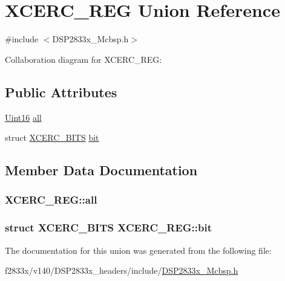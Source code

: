 \hypertarget{union_x_c_e_r_c___r_e_g}{}\section{X\+C\+E\+R\+C\+\_\+\+R\+E\+G Union Reference}
\label{union_x_c_e_r_c___r_e_g}


{\ttfamily \#include $<$D\+S\+P2833x\+\_\+\+Mcbsp.\+h$>$}



Collaboration diagram for X\+C\+E\+R\+C\+\_\+\+R\+E\+G\+:
\subsection*{Public Attributes}
\begin{DoxyCompactItemize}
\item 
\hyperlink{_d_s_p2833x___device_8h_a59a9f6be4562c327cbfb4f7e8e18f08b}{Uint16} \hyperlink{union_x_c_e_r_c___r_e_g_ada998b2975a3be053f4df00200d0ba6f}{all}
\item 
struct \hyperlink{struct_x_c_e_r_c___b_i_t_s}{X\+C\+E\+R\+C\+\_\+\+B\+I\+T\+S} \hyperlink{union_x_c_e_r_c___r_e_g_a4f09084acb6eabceec9b60781bb131cd}{bit}
\end{DoxyCompactItemize}


\subsection{Member Data Documentation}
\hypertarget{union_x_c_e_r_c___r_e_g_ada998b2975a3be053f4df00200d0ba6f}{}
\subsubsection[{all}]{ X\+C\+E\+R\+C\+\_\+\+R\+E\+G\+::all}\label{union_x_c_e_r_c___r_e_g_ada998b2975a3be053f4df00200d0ba6f}
\hypertarget{union_x_c_e_r_c___r_e_g_a4f09084acb6eabceec9b60781bb131cd}{}
\subsubsection[{bit}]{\setlength{\rightskip}{0pt plus 5cm}struct {\bf X\+C\+E\+R\+C\+\_\+\+B\+I\+T\+S} X\+C\+E\+R\+C\+\_\+\+R\+E\+G\+::bit}\label{union_x_c_e_r_c___r_e_g_a4f09084acb6eabceec9b60781bb131cd}


The documentation for this union was generated from the following file\+:\begin{DoxyCompactItemize}
\item 
f2833x/v140/\+D\+S\+P2833x\+\_\+headers/include/\hyperlink{_d_s_p2833x___mcbsp_8h}{D\+S\+P2833x\+\_\+\+Mcbsp.\+h}\end{DoxyCompactItemize}
